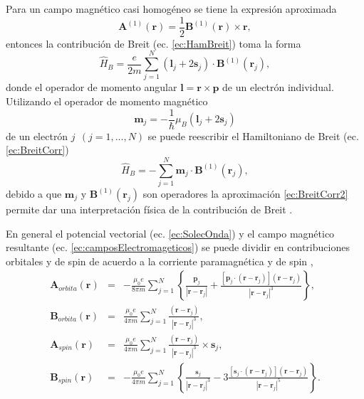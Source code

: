 \newline
Para un campo magn\'etico casi homog\'eneo se tiene la expresi\'on aproximada \cite{MB-2015, Scott_1980}
\begin{equation}
	\pmb{A}^{(1)} (\pmb{r}) = \frac{1}{2} \pmb{B}^{(1)} (\pmb{r}) \times \pmb{r}, \label{ec:Aaprox}
\end{equation}
entonces la contribuci\'on de Breit (ec. \ref{ec:HamBreit}) toma la forma \cite{Scott_1980}
\begin{equation}
	\hat{H}_B = \frac{e}{2m} \sum_{j=1}^N (\pmb{l}_j + 2 \pmb{s}_j) \cdot \pmb{B}^{(1)} (\pmb{r}_j), \label{ec:BreitCorr}
\end{equation}
donde el operador de momento angular $\pmb{l}= \pmb{r} \times \pmb{p}$ de un electr\'on  individual. Utilizando el operador de momento magn\'etico
\begin{equation}
	\pmb{m}_j = - \frac{1}{\hbar} \mu_{B} (\pmb{l}_j + 2 \pmb{s}_j) \label{ec:opMagn}
\end{equation}
de un electr\'on $j ~~(j=1,...,N)$  se puede reescribir el Hamiltoniano de Breit (ec. \ref{ec:BreitCorr}) 
\begin{equation}
	\hat{H}_B = -\sum_{j=1}^N \pmb{m}_j \cdot \pmb{B}^{(1)} (\pmb{r}_j), \label{ec:BreitCorr2}
\end{equation} 
debido a que $\pmb{m}_j$ y $\pmb{B}^{(1)} (\pmb{r}_j)$ son operadores la aproximaci\'on \ref{ec:BreitCorr2} permite dar una interpretaci\'on f\'isica de la contribuci\'on de Breit \cite{Scott_1980}.
\newline
\par En general el potencial vectorial (ec. \ref{ec:SolecOnda}) y el campo magn\'etico resultante (ec. \ref{ec:camposElectromageticos}) se puede dividir en contribuciones orbitales y de spin de acuerdo a la corriente paramagn\'etica y de spin \cite{MB-2015},
\begin{eqnarray}
	\pmb{A}_{orbita} (\pmb{r}) &=&- \frac{\mu_0 e}{8 \pi m} \sum_{j=1}^N \left\{\frac{\pmb{p}_j}{|\pmb{r}-\pmb{r}_j|} + \frac{[\pmb{p}_j \cdot (\pmb{r}-\pmb{r}_j)](\pmb{r}-\pmb{r}_j)}{|\pmb{r}-\pmb{r}_j|^3} \right\}, \nonumber \\
	\pmb{B}_{orbita} (\pmb{r}) &=& \frac{\mu_0 e}{4 \pi m} \sum_{j=1}^N \frac{(\pmb{r}-\pmb{r}_j)}{|\pmb{r}-\pmb{r}_j|^3}, \nonumber \\
	\pmb{A}_{spin} (\pmb{r}) &=& \frac{\mu_0 e}{4 \pi m} \sum_{j=1}^N \frac{(\pmb{r}-\pmb{r}_j)}{|\pmb{r}-\pmb{r}_j|^3} \times \pmb{s}_j, \\
	\pmb{B}_{spin} (\pmb{r}) &=&- \frac{\mu_0 e}{4 \pi m} \sum_{j=1}^N \left\{\frac{\pmb{s}_j}{|\pmb{r}-\pmb{r}_j|^3} -3 \frac{[\pmb{s}_j \cdot (\pmb{r}-\pmb{r}_j)](\pmb{r}-\pmb{r}_j)}{|\pmb{r}-\pmb{r}_j|^5} \right\}. \nonumber 
\end{eqnarray} 
